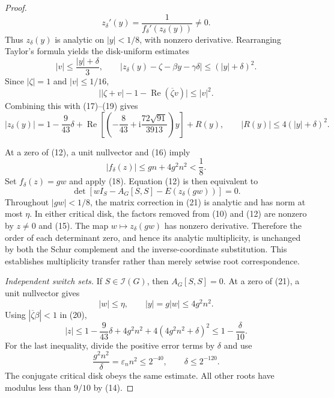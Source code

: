 \documentclass{article}
\begin{document}
\begin{proof}
\[
 z_\delta'(y)=\frac1{f_\delta'(z_\delta(y))}\neq0.
\]
Thus \(z_\delta(y)\) is analytic on \(|y|<1/8\), with nonzero derivative. Rearranging Taylor's formula yields the disk-uniform estimates
\[
 |v|\leq\frac{|y|+\delta}{3},
 \qquad
 |z_\delta(y)-\zeta-\beta y-\gamma\delta|
 \leq(|y|+\delta)^2.
\tag{19}
\]
Since \(|\zeta|=1\) and \(|v|\leq1/16\),
\[
 \bigl||\zeta+v|-1-\operatorname{Re}(\overline\zeta v)\bigr|
 \leq |v|^2.
\]
Combining this with (17)--(19) gives
\[
 |z_\delta(y)|
 =1-\frac9{43}\delta
  +\operatorname{Re}\!\left[
    \left(-\frac8{43}
      +\mathrm i\frac{72\sqrt{91}}{3913}\right)y
   \right]+R(y),
\qquad
 |R(y)|\leq4(|y|+\delta)^2.
\tag{20}
\]

At a zero of (12), a unit nullvector and (16) imply
\[
 |f_\delta(z)|\leq gn+4g^2n^2<\frac18.
\]
Set \(f_\delta(z)=gw\) and apply (18). Equation (12) is then equivalent to
\[
 \det\!\left[
 wI_S-A_G[S,S]-E(z_\delta(gw))
 \right]=0.
\tag{21}
\]
Throughout \(|gw|<1/8\), the matrix correction in (21) is analytic and has norm at most \(\eta\). In either critical disk, the factors removed from (10) and (12) are nonzero by \(z\neq0\) and (15). The map \(w\mapsto z_\delta(gw)\) has nonzero derivative. Therefore the order of each determinant zero, and hence its analytic multiplicity, is unchanged by both the Schur complement and the inverse-coordinate substitution. This establishes multiplicity transfer rather than merely setwise root correspondence.

\emph{Independent switch sets.}
If \(S\in\mathcal I(G)\), then \(A_G[S,S]=0\). At a zero of (21), a unit nullvector gives
\[
 |w|\leq\eta,\qquad |y|=g|w|\leq4g^2n^2.
\]
Using \(|\overline\zeta\beta|<1\) in (20),
\[
 |z|
 \leq1-\frac9{43}\delta+4g^2n^2
       +4(4g^2n^2+\delta)^2
 \leq1-\frac{\delta}{10}.
\tag{22}
\]
For the last inequality, divide the positive error terms by \(\delta\) and use
\[
 \frac{g^2n^2}{\delta}=\varepsilon_n n^2\leq2^{-40},
 \qquad \delta\leq2^{-120}.
\]
The conjugate critical disk obeys the same estimate. All other roots have modulus less than \(9/10\) by (14).


\end{proof}
\end{document}
